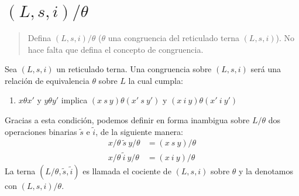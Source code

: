 \documentclass{article}
\begin{document}
\section{$(L,s,i)/\theta$}
\begin{quote}
  Defina $(L,s,i)/\theta$ ($\theta$ una congruencia del reticulado terna $(L,s,i)$). No hace falta que defina el concepto de congruencia.
\end{quote}
Sea $(L,s,i)$ un reticulado terna. Una congruencia sobre $(L,s,i)$ será una relación de equivalencia $\theta$ sobre $L$ la cual cumpla:
\begin{enumerate}
  \item $x\theta x'$ y $y\theta y'$ implica $(x\ s\ y)\theta(x'\ s\ y')$ y $(x\ i\ y)\theta(x'\ i\ y')$
\end{enumerate}
Gracias a esta condición, podemos definir en forma inambigua sobre $L/\theta$ dos operaciones binarias $\tilde{s}$ e $\tilde{i}$, de la siguiente manera:
\begin{equation*}
  \begin{aligned}
    x/\theta\ \tilde{s}\ y/\theta & = (x\ s\ y)/\theta \\
    x/\theta\ \tilde{i}\ y/\theta & = (x\ i\ y)/\theta
  \end{aligned}
\end{equation*}
La terna $(L/\theta,\tilde{s},\tilde{i})$ es llamada el cociente de $(L,s,i)$ sobre $\theta$ y la denotamos con $(L,s,i)/\theta$.
\end{document}

